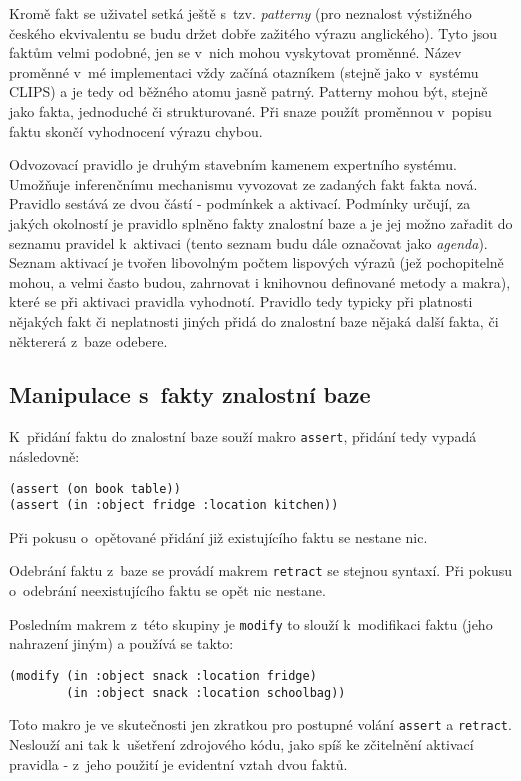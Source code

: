 Kromě fakt se uživatel setká ještě s~tzv. \emph{patterny} (pro neznalost
výstižného českého ekvivalentu se budu držet dobře zažitého výrazu anglického).
Tyto jsou faktům velmi podobné, jen se v~nich mohou vyskytovat proměnné.
Název proměnné v~mé implementaci vždy začíná otazníkem (stejně jako v~systému
CLIPS) a je tedy od běžného atomu jasně patrný. Patterny mohou být, stejně
jako fakta, jednoduché či strukturované. Při snaze použít proměnnou v~popisu
faktu skončí vyhodnocení výrazu chybou.

Odvozovací pravidlo je druhým stavebním kamenem expertního systému. Umožňuje
inferenčnímu mechanismu vyvozovat ze zadaných fakt fakta nová. Pravidlo sestává
ze dvou částí - podmínkek a aktivací. Podmínky určují, za jakých okolností je 
pravidlo splněno fakty znalostní baze a je jej možno zařadit do seznamu pravidel
k~aktivaci (tento seznam budu dále označovat jako \emph{agenda}). Seznam
aktivací je tvořen libovolným počtem lispových výrazů (jež pochopitelně mohou,
a velmi často budou, zahrnovat i knihovnou definované metody a makra), které se
při aktivaci pravidla vyhodnotí. Pravidlo tedy typicky při platnosti nějakých
fakt či neplatnosti jiných přidá do znalostní baze nějaká další fakta, či
některerá z~baze odebere.
\subsection{Manipulace s~fakty znalostní baze}
K~přidání faktu do znalostní baze souží makro \verb|assert|, přidání tedy
vypadá následovně:
\begin{verbatim}
(assert (on book table))
(assert (in :object fridge :location kitchen))
\end{verbatim}
Při pokusu o~opětované přidání již existujícího faktu se nestane nic.

Odebrání faktu z~baze se provádí makrem \verb|retract| se stejnou syntaxí.
Při pokusu o~odebrání neexistujícího faktu se opět nic nestane.

Posledním makrem z~této skupiny je \verb|modify| to slouží k~modifikaci
faktu (jeho nahrazení jiným) a používá se takto:
\begin{verbatim}
(modify (in :object snack :location fridge)
        (in :object snack :location schoolbag))
\end{verbatim}
Toto makro je ve skutečnosti jen zkratkou pro postupné volání \verb|assert|
a \verb|retract|. Neslouží ani tak k~ušetření zdrojového kódu, jako spíš
ke zčitelnění aktivací pravidla - z~jeho použití je evidentní vztah dvou
faktů.

